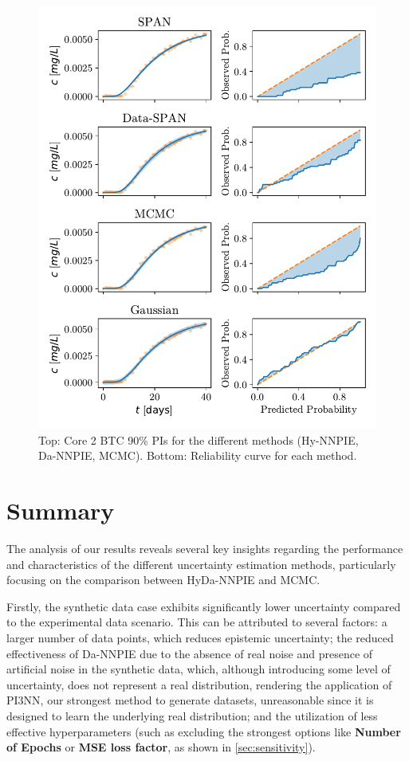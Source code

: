 \begin{figure}[h]
    \centering
    \includegraphics{figs/reliability_curves.pdf}
    \caption{Top: Core 2 BTC 90\% PIs for the different methods (Hy-NNPIE, Da-NNPIE, MCMC). Bottom: Reliability curve for each method.}
    \label{fig:reliability_curves}
\end{figure}


\section{Summary}
The analysis of our results reveals several key insights regarding the performance and characteristics of the different uncertainty estimation methods, particularly focusing on the comparison between HyDa-NNPIE and MCMC.

Firstly, the synthetic data case exhibits significantly lower uncertainty compared to the experimental data scenario. This can be attributed to several factors: a larger number of data points, which reduces epistemic uncertainty; the reduced effectiveness of Da-NNPIE due to the absence of real noise and presence of artificial noise in the synthetic data, which, although introducing some level of uncertainty, does not represent a real distribution, rendering the application of PI3NN, our strongest method to generate datasets, unreasonable since it is designed to learn the underlying real distribution; and the utilization of less effective hyperparameters (such as excluding the strongest options like \textbf{Number of Epochs} or \textbf{MSE loss factor}, as shown in \cref{sec:sensitivity}).

